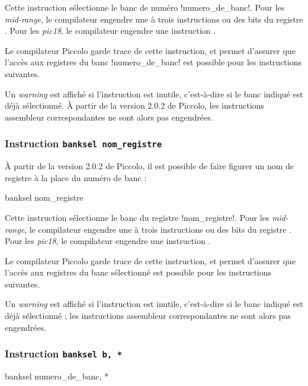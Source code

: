 Cette instruction sélectionne le banc de numéro \pic!numero_de_banc!. Pour les \emph{mid-range}, le compilateur engendre une à trois instructions  ou  des bits  du registre . Pour les \emph{pic18}, le compilateur engendre une instruction .

Le compilateur Piccolo garde trace de cette instruction, et permet d'assurer que l'accès aux registres du banc \pic!numero_de_banc! est possible pour les instructions suivantes.

Un \emph{warning} est affiché si l'instruction est inutile, c'est-à-dire si le banc indiqué est déjà sélectionné. À partir de la version 2.0.2 de Piccolo, les instructions assembleur correspondantes ne sont alors pas engendrées.






\subsubsection{Instruction \texttt{banksel nom\_registre}}
À partir de la version 2.0.2 de Piccolo, il est possible de faire figurer un nom de registre à la place du numéro de banc :
\begin{piccolo}
banksel nom_registre
\end{piccolo}

Cette instruction sélectionne le banc du registre \pic!nom_registre!. Pour les \emph{mid-range}, le compilateur engendre une à trois instructions  ou  des bits  du registre . Pour les \emph{pic18}, le compilateur engendre une instruction .

Le compilateur Piccolo garde trace de cette instruction, et permet d'assurer que l'accès aux registres du banc sélectionné est possible pour les instructions suivantes.

Un \emph{warning} est affiché si l'instruction est inutile, c'est-à-dire si le banc indiqué est déjà sélectionné ; les instructions assembleur correspondantes ne sont alors pas engendrées.




\subsubsection{Instruction \texttt{banksel b, *}}
\begin{piccolo}
banksel numero_de_banc, *
\end{piccolo}

